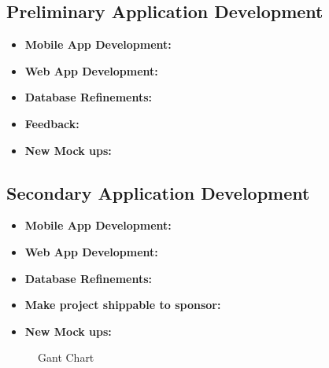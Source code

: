 \documentclass[Letter,11pt]{article}
\begin{document}
		\subsection{Preliminary Application Development}\label{dev1}
		
		\begin{itemize}
			\item\textbf{Mobile App Development:}\\
			
			\item \textbf{Web App Development:}\\
			
			\item\textbf{Database Refinements:}\\
			
			\item\textbf{Feedback:}\\
			
			\item\textbf{New Mock ups:}\\
			
		\end{itemize}
		
	\subsection{Secondary Application Development}\label{dev2}
		
		\begin{itemize}
			\item\textbf{Mobile App Development:}\\
			
			\item \textbf{Web App Development:}\\
			
			
			\item\textbf{Database Refinements:}\\
			
			\item\textbf{Make project shippable to sponsor:}\\
			
			\item\textbf{New Mock ups:}\\
			
		\end{itemize}
		
		\begin{landscape}
			\begin{figure}
				
				\caption{\label{fig:gant}Gant Chart}
			\end{figure}
		\end{landscape}
	
\end{document}
